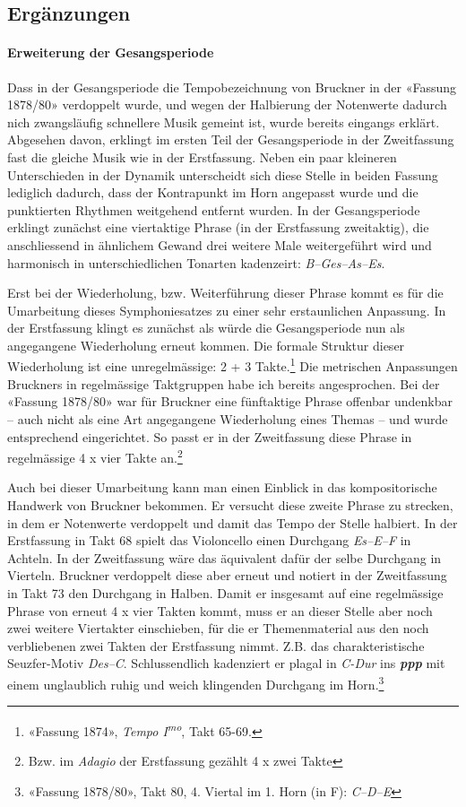 \subsection{Ergänzungen}

\paragraph{Erweiterung der Gesangsperiode}

Dass in der Gesangsperiode die Tempobezeichnung von Bruckner in der «Fassung 1878/80» verdoppelt wurde, und wegen der Halbierung der Notenwerte dadurch nich zwangsläufig schnellere Musik gemeint ist, wurde bereits eingangs erklärt.
Abgesehen davon, erklingt im ersten Teil der Gesangsperiode in der Zweitfassung fast die gleiche Musik wie in der Erstfassung.
Neben ein paar kleineren Unterschieden in der Dynamik unterscheidt sich diese Stelle in beiden Fassung lediglich dadurch, dass der Kontrapunkt im Horn angepasst wurde und die punktierten Rhythmen weitgehend entfernt wurden.
In der Gesangsperiode erklingt zunächst eine viertaktige Phrase (in der Erstfassung zweitaktig), die anschliessend in ähnlichem Gewand drei weitere Male weitergeführt wird und harmonisch in unterschiedlichen Tonarten kadenzeirt: \emph{B--Ges--As--Es}.

Erst bei der Wiederholung, bzw. Weiterführung dieser Phrase kommt es für die Umarbeitung dieses Symphoniesatzes zu einer sehr erstaunlichen Anpassung.
In der Erstfassung klingt es zunächst als würde die Gesangsperiode nun als angegangene Wiederholung erneut kommen.
Die formale Struktur dieser Wiederholung ist eine unregelmässige: 2 + 3 Takte.\footnote{«Fassung 1874», \emph{Tempo I\textsuperscript{mo}}, Takt 65-69.}
Die metrischen Anpassungen Bruckners in regelmässige Taktgruppen habe ich bereits angesprochen.
Bei der «Fassung 1878/80» war für Bruckner eine fünftaktige Phrase offenbar undenkbar – auch nicht als eine Art angegangene Wiederholung eines Themas – und wurde entsprechend eingerichtet.
So passt er in der Zweitfassung diese Phrase in regelmässige 4 x vier Takte an.\footnote{Bzw. im \emph{Adagio} der Erstfassung gezählt 4 x zwei Takte}

Auch bei dieser Umarbeitung kann man einen Einblick in das kompositorische Handwerk von Bruckner bekommen.
Er versucht diese zweite Phrase zu strecken, in dem er Notenwerte verdoppelt und damit das Tempo der Stelle halbiert.
In der Erstfassung in Takt 68 spielt das Violoncello einen Durchgang \emph{Es--E--F} in Achteln.
In der Zweitfassung wäre das äquivalent dafür der selbe Durchgang in Vierteln.
Bruckner verdoppelt diese aber erneut und notiert in der Zweitfassung in Takt 73 den Durchgang in Halben.
Damit er insgesamt auf eine regelmässige Phrase von erneut 4 x vier Takten kommt, muss er an dieser Stelle aber noch zwei weitere Viertakter einschieben, für die er Themenmaterial aus den noch verbliebenen zwei Takten der Erstfassung nimmt.
Z.B. das charakteristische Seuzfer-Motiv \emph{Des--C}.
Schlussendlich kadenziert er plagal in \emph{C-Dur} ins \textbf{\emph{ppp}} mit einem unglaublich ruhig und weich klingenden Durchgang im Horn.\footnote{«Fassung 1878/80», Takt 80, 4. Viertal im 1. Horn (in F): \emph{C--D--E}}


